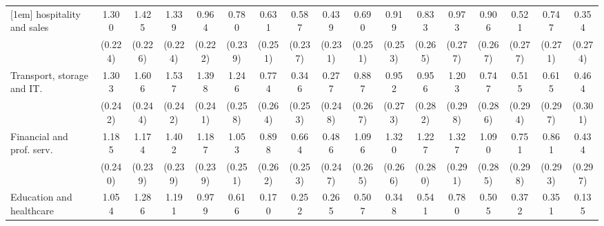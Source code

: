 {\begin{tabular}{l*{16}{c}}
[1em]
hospitality and sales&       1.300\sym{***}&       1.425\sym{***}&       1.339\sym{***}&       0.964\sym{***}&       0.780\sym{**} &       0.631\sym{*}  &       0.587\sym{*}  &       0.439         &       0.690\sym{**} &       0.919\sym{***}&       0.833\sym{**} &       0.973\sym{***}&       0.906\sym{***}&       0.521         &       0.747\sym{**} &       0.354         \\
                    &     (0.224)         &     (0.226)         &     (0.224)         &     (0.222)         &     (0.239)         &     (0.251)         &     (0.237)         &     (0.231)         &     (0.251)         &     (0.253)         &     (0.265)         &     (0.277)         &     (0.267)         &     (0.277)         &     (0.271)         &     (0.274)         \\
[1em]
Transport, storage and IT.&       1.303\sym{***}&       1.606\sym{***}&       1.537\sym{***}&       1.398\sym{***}&       1.246\sym{***}&       0.774\sym{**} &       0.346         &       0.277         &       0.887\sym{***}&       0.952\sym{***}&       0.956\sym{***}&       1.203\sym{***}&       0.747\sym{**} &       0.515         &       0.615\sym{*}  &       0.464         \\
                    &     (0.242)         &     (0.244)         &     (0.242)         &     (0.241)         &     (0.258)         &     (0.264)         &     (0.253)         &     (0.248)         &     (0.267)         &     (0.273)         &     (0.282)         &     (0.298)         &     (0.286)         &     (0.294)         &     (0.297)         &     (0.301)         \\
[1em]
Financial and prof. serv.&       1.185\sym{***}&       1.174\sym{***}&       1.402\sym{***}&       1.187\sym{***}&       1.053\sym{***}&       0.898\sym{***}&       0.664\sym{**} &       0.486\sym{*}  &       1.096\sym{***}&       1.320\sym{***}&       1.227\sym{***}&       1.327\sym{***}&       1.090\sym{***}&       0.751\sym{*}  &       0.861\sym{**} &       0.434         \\
                    &     (0.240)         &     (0.239)         &     (0.239)         &     (0.239)         &     (0.251)         &     (0.262)         &     (0.253)         &     (0.247)         &     (0.265)         &     (0.266)         &     (0.280)         &     (0.291)         &     (0.285)         &     (0.298)         &     (0.293)         &     (0.297)         \\
[1em]
Education and healthcare&       1.054\sym{***}&       1.286\sym{***}&       1.191\sym{***}&       0.979\sym{***}&       0.616\sym{*}  &       0.170         &       0.252         &       0.265         &       0.507         &       0.348         &       0.541         &       0.780\sym{*}  &       0.505         &       0.372         &       0.351         &       0.135         \\

\end{tabular}}
